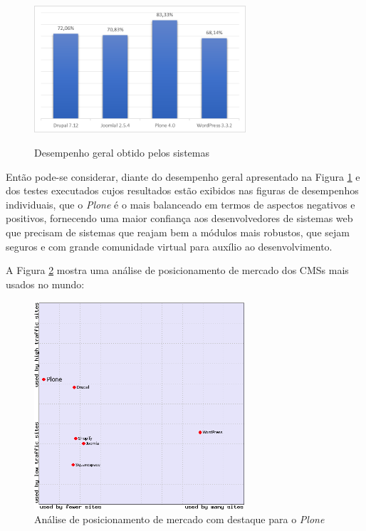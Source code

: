 \begin{figure}[htb]
 \centering
 \caption{Desempenho geral obtido pelos sistemas}
 \includegraphics[width=0.7\textwidth]{figuras/desempenho-geral-cms}
 \label{desempenho-geral}
\end{figure}


Então pode-se considerar, diante do desempenho geral apresentado na Figura \ref{desempenho-geral} e dos testes executados cujos resultados estão exibidos nas figuras de desempenhos individuais, que o \textit{Plone} é o mais balanceado em termos de aspectos negativos e positivos, fornecendo uma maior confiança aos desenvolvedores de sistemas web que precisam de sistemas que reajam bem a módulos mais robustos, que sejam seguros e com grande comunidade virtual para auxílio ao desenvolvimento.

A Figura \ref{uso-plone-mercado} mostra uma análise de posicionamento de mercado dos CMSs mais usados no mundo:

\begin{figure}[htb]
 \centering
 \caption{Análise de posicionamento de mercado com destaque para o \textit{Plone}}
 \includegraphics[width=0.7\textwidth]{figuras/cms_mercado}
 
 \label{uso-plone-mercado}
\end{figure}

